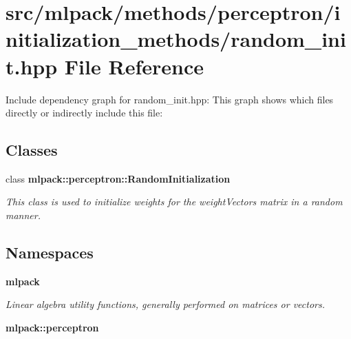 \section{src/mlpack/methods/perceptron/initialization\-\_\-methods/random\-\_\-init.hpp File Reference}
\label{perceptron_2initialization__methods_2random__init_8hpp}
Include dependency graph for random\-\_\-init.\-hpp\-:
This graph shows which files directly or indirectly include this file\-:
\subsection*{Classes}
\begin{DoxyCompactItemize}
\item 
class {\bf mlpack\-::perceptron\-::\-Random\-Initialization}
\begin{DoxyCompactList}\small\item\em This class is used to initialize weights for the weight\-Vectors matrix in a random manner. \end{DoxyCompactList}\end{DoxyCompactItemize}
\subsection*{Namespaces}
\begin{DoxyCompactItemize}
\item 
{\bf mlpack}
\begin{DoxyCompactList}\small\item\em Linear algebra utility functions, generally performed on matrices or vectors. \end{DoxyCompactList}\item 
{\bf mlpack\-::perceptron}
\end{DoxyCompactItemize}
